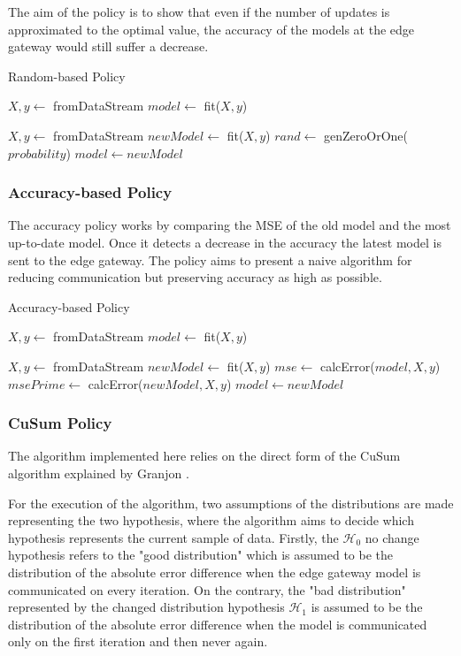 \documentclass{mpaper}
\begin{document}
The aim of the policy is to show that even if the number of updates is approximated to the optimal value, the accuracy of the models at the edge gateway would still suffer a decrease.

\begin{algorithm}[h]
\caption{Random-based Policy}\label{polR}
\begin{algorithmic}
\State $X,y \gets$ fromDataStream
\State $model \gets$ fit($X,y$)

    \State $X, y \gets$ fromDataStream
    \State $newModel \gets$ fit($X,y$)
    \State $rand \gets$ genZeroOrOne($probability$)
        \State $model \gets newModel$ 
    \EndIf
\EndWhile
\end{algorithmic}
\end{algorithm}
\vfill
\subsubsection{Accuracy-based Policy}
The accuracy policy works by comparing the MSE of the old model and the most up-to-date model. Once it detects a decrease in the accuracy the latest model is sent to the edge gateway.
The policy aims to present a naive algorithm for reducing communication but preserving accuracy as high as possible.

\begin{algorithm}[h]
\caption{Accuracy-based Policy}\label{polA}
\begin{algorithmic}
\State $X, y \gets$ fromDataStream
\State $model \gets$ fit($X,y$)

    \State $X, y \gets$ fromDataStream
    \State $newModel \gets$ fit($X,y$)
    \State $mse \gets$ calcError($model, X, y$)
    \State $msePrime \gets$ calcError($newModel, X, y$)
        \State $model \gets newModel$ 
    \EndIf
\EndWhile
\end{algorithmic}
\end{algorithm}

\subsubsection{CuSum Policy}
The algorithm implemented here relies on the direct form of the CuSum algorithm explained by Granjon \cite{cusum_pierre}.

For the execution of the algorithm, two assumptions of the distributions are made representing the two hypothesis, where the algorithm aims to decide which hypothesis represents the current sample of data. 
Firstly, the $\mathcal{H}_0$ no change hypothesis refers to the "good distribution" which is assumed to be the distribution of the absolute error difference when the edge gateway model is communicated on every iteration. On the contrary, the "bad distribution" represented by the changed distribution hypothesis $\mathcal{H}_1$ is assumed to be the distribution of the absolute error difference when the model is communicated only on the first iteration and then never again.
\end{document}
